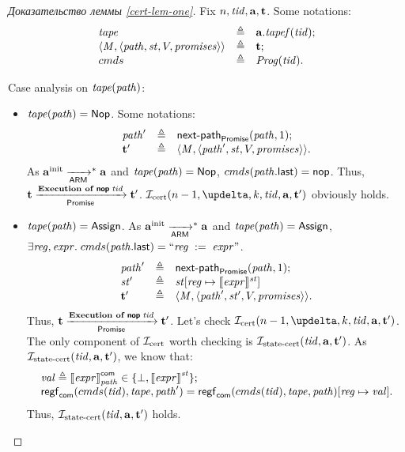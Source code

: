 \begin{proof}[Доказательство леммы \ref{cert-lem-one}]
  Fix $n, \tId, \aT, \tT$.
  Some notations:
  \[\begin{array}{l c l}
  \tape & \triangleq & \aT.\tapef(\tId); \\
  \angled{\Mprom, \angled{\cpath, \PromState, \V, \PromSet}} & \triangleq & \tT; \\
  \Cprom & \triangleq & \Cfprom(\tId). \\
  \end{array}\]

  Case analysis on $\tape(\cpath)$:
  \begin{itemize}
    \item $\tape(\cpath) = \tapeNop$.
      Some notations:
      \[\begin{array}{l l l}
        \cpath' & \triangleq & \nextPathProm(\cpath, 1); \\
        \tT'    & \triangleq & \angled{\Mprom, \angled{\cpath', \PromState, \V, \PromSet}}.
      \end{array}\]
      As $\ainit \armStepP^{*} \aT$ and $\tape(\cpath) = \tapeNop$, $\Cprom(\lastInstr{\cpath}) = \nop$.
      Thus, $\tT \promStepNop \tT'$.
      $\invCert(n - 1, \delta, k, \tId, \aT, \tT')$ obviously holds.

    \item $\tape(\cpath) = \tapeAssign$.
      As $\ainit \armStepP^{*} \aT$ and $\tape(\cpath) = \tapeAssign$, \\
      $\exists \reg, \expr. \; \Cprom(\lastInstr{\cpath}) = ``\assignInst{\reg}{\expr}"$.
      \[\begin{array}{l l l}
        \cpath'     & \triangleq & \nextPathProm(\cpath, 1); \\
        \PromState' & \triangleq & \PromState[\reg \mapsto \semState{\expr}{\PromState}] \\
        \tT'        & \triangleq & \angled{\Mprom, \angled{\cpath', \PromState', \V, \PromSet}}.
      \end{array}\]
      Thus, $\tT \promStepNop \tT'$. Let's check $\invCert(n - 1, \delta, k, \tId, \aT, \tT')$.
      The only component of $\invCert$ worth checking is $\invStateCERT(\tId, \aT, \tT')$.
      As $\invStateCERT(\tId, \aT, \tT')$, we know that:
      \[\begin{array}{l}
        \stval \triangleq |[\expr|]^{\Committed}_{\cpath} \in \{\bot, |[\expr|]^{\PromState}\}; \\
        \regstcom(\Cprom(\tId), \tape, \cpath') = \regstcom(\Cprom(\tId), \tape, \cpath)[\reg \mapsto \stval]. \\
      \end{array}\]
      Thus, $\invStateCERT(\tId, \aT, \tT')$ holds.


\end{itemize}
\end{proof}
